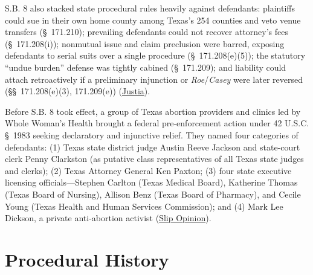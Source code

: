 \documentclass[12pt]{article}
\begin{document}
S.B. 8 also stacked state procedural rules heavily against defendants: plaintiffs could sue in their own home county among Texas's 254 counties and veto venue transfers (\S~171.210); prevailing defendants could not recover attorney's fees (\S~171.208(i)); nonmutual issue and claim preclusion were barred, exposing defendants to serial suits over a single procedure (\S~171.208(e)(5)); the statutory ``undue burden'' defense was tightly cabined (\S~171.209); and liability could attach retroactively if a preliminary injunction or \textit{Roe}/\textit{Casey} were later reversed (\S\S~171.208(e)(3), 171.209(e)) (\href{https://supreme.justia.com/cases/federal/us/595/21-463/}{Justia}).

Before S.B. 8 took effect, a group of Texas abortion providers and clinics led by Whole Woman's Health brought a federal pre-enforcement action under 42 U.S.C. \S~1983 seeking declaratory and injunctive relief. They named four categories of defendants: (1) Texas state district judge Austin Reeve Jackson and state-court clerk Penny Clarkston (as putative class representatives of all Texas state judges and clerks); (2) Texas Attorney General Ken Paxton; (3) four state executive licensing officials---Stephen Carlton (Texas Medical Board), Katherine Thomas (Texas Board of Nursing), Allison Benz (Texas Board of Pharmacy), and Cecile Young (Texas Health and Human Services Commission); and (4) Mark Lee Dickson, a private anti-abortion activist (\href{https://www.supremecourt.gov/opinions/21pdf/21-463_3ebh.pdf}{Slip Opinion}).

\section{Procedural History}
\end{document}
